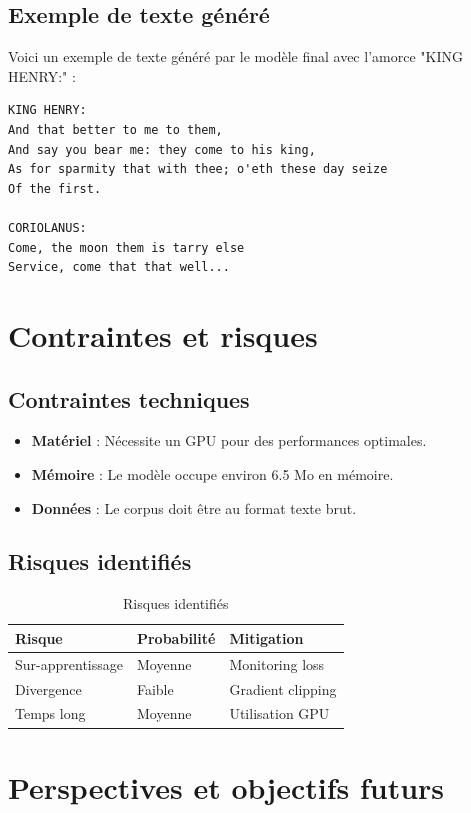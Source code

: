\documentclass[a4paper]{article}
\begin{document}
\subsection{Exemple de texte généré}
Voici un exemple de texte généré par le modèle final avec l'amorce "KING HENRY:" :

\begin{lstlisting}
KING HENRY:
And that better to me to them,
And say you bear me: they come to his king,
As for sparmity that with thee; o'eth these day seize
Of the first.

CORIOLANUS:
Come, the moon them is tarry else
Service, come that that well...
\end{lstlisting}

\section{Contraintes et risques}

\subsection{Contraintes techniques}
\begin{itemize}
    \item \textbf{Matériel} : Nécessite un GPU pour des performances optimales.
    \item \textbf{Mémoire} : Le modèle occupe environ 6.5 Mo en mémoire.
    \item \textbf{Données} : Le corpus doit être au format texte brut.
\end{itemize}

\subsection{Risques identifiés}
\begin{table}[h]
\caption{Risques identifiés}
\label{tab:risques}
\centering
\begin{tabular}{lll}
\toprule
\textbf{Risque} & \textbf{Probabilité} & \textbf{Mitigation} \\
\midrule
Sur-apprentissage & Moyenne & Monitoring loss \\
Divergence & Faible & Gradient clipping \\
Temps long & Moyenne & Utilisation GPU \\
\bottomrule
\end{tabular}
\end{table}

\section{Perspectives et objectifs futurs}
\end{document}
